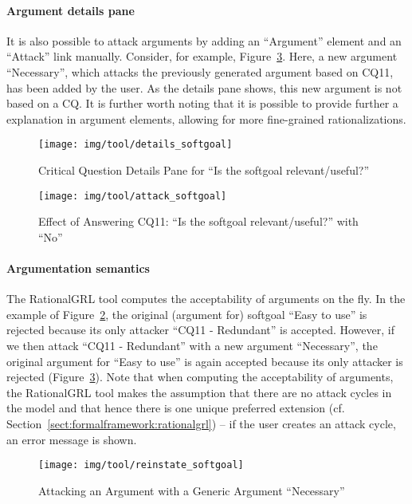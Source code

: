 \paragraph{Argument details pane} It is also possible to attack arguments by adding an ``Argument'' element and an ``Attack'' link manually. Consider, for example, Figure~\ref{fig:tool:argument}. Here, a new argument ``Necessary'', which attacks the previously generated argument based on CQ11, has been added by the user. As the details pane shows, this new argument is not based on a CQ. It is further worth noting that it is possible to provide further a explanation in argument elements, allowing for more fine-grained rationalizations. 

\begin{figure}[t]
\centering
\texttt{[image: img/tool/details\_softgoal]}
\caption{Critical Question Details Pane for ``Is the softgoal relevant/useful?''}
\label{fig:tool:cqdetails}
\end{figure}

\begin{figure}[b]
\centering
\texttt{[image: img/tool/attack\_softgoal]}
\caption{Effect of Answering CQ11: ``Is the softgoal relevant/useful?'' with ``No''}
\label{fig:tool:cqeffect}
\end{figure}

\paragraph{Argumentation semantics} The RationalGRL tool computes the acceptability of arguments on the fly. In the example of Figure~\ref{fig:tool:cqeffect}, the original (argument for) softgoal ``Easy to use'' is rejected because its only attacker ``CQ11 - Redundant'' is accepted. However, if we then attack ``CQ11 - Redundant'' with a new argument ``Necessary'', the original argument for ``Easy to use'' is again accepted because its only attacker is rejected  (Figure~\ref{fig:tool:argument}). Note that when computing the acceptability of arguments, the RationalGRL tool makes the assumption that there are no attack cycles in the model and that hence there is one unique preferred extension (cf. Section~\ref{sect:formalframework:rationalgrl}) -- if the user creates an attack cycle, an error message is shown. 

\begin{figure}[t]
\centering
\texttt{[image: img/tool/reinstate\_softgoal]}
\caption{Attacking an Argument with a Generic Argument ``Necessary''}
\label{fig:tool:argument}
\end{figure}

